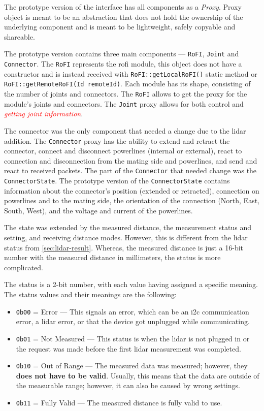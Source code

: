 \documentclass[
  digital,     %
  oneside,     %
  nosansbold,  %
  nocolorbold, %
  nolof,         %
  nolot,         %
]{fithesis4}
\newcommand{\TODO}[1]{\textcolor{red}{\textit{#1}}}
\begin{document}
{{{The prototype version of the interface has all components as a \emph{Proxy}. Proxy object is meant to be an abstraction that does not hold the ownership of the underlying component and is meant to be lightweight, safely copyable and shareable.

The prototype version contains three main components --- \lstinline[breakatwhitespace]|RoFI|, \lstinline|Joint| and \lstinline|Connector|. The \lstinline|RoFI| represents the \acrshort{rofi} module, this object does not have a constructor and is instead received with \lstinline|RoFI::getLocalRoFI()| static method or \lstinline|RoFI::getRemoteRoFI(Id remoteId)|. Each module has its shape, consisting of the number of joints and connectors. The \lstinline|RoFI| allows to get the proxy for the module's joints and connectors. The \lstinline|Joint| proxy allows for both control and \TODO{getting joint information}.

The connector was the only component that needed a change due to the \acrshort{lidar} addition. The \lstinline|Connector| proxy has the ability to extend and retract the connector, connect and disconnect powerlines (internal or external), react to connection and disconnection from the mating side and powerlines, and send and react to received packets. The part of the \lstinline|Connector| that needed change was the \lstinline|ConnectorState|. The prototype version of the \lstinline|ConnectorState| contains information about the connector's position (extended or retracted), connection on powerlines and to the mating side, the orientation of the connection (North, East, South, West), and the voltage and current of the powerlines.

The state was extended by the measured distance, the measurement status and setting, and receiving distance modes. However, this is different from the \acrshort{lidar} status from \autoref{sec:lidar-result}. Whereas, the measured distance is just a 16-bit number with the measured distance in millimeters, the status is more complicated.

The status is a 2-bit number, with each value having assigned a specific meaning. The status values and their meanings are the following:
\begin{itemize}
    \item \lstinline|0b00| = Error --- This signals an error, which can be an \acrshort{i2c} communication error, a \acrshort{lidar} error, or that the device got unplugged while communicating.  
    \item \lstinline|0b01| = Not Measured --- This status is when the \acrshort{lidar} is not plugged in or the request was made before the first \acrshort{lidar} measurement was completed.
    \item \lstinline|0b10| = Out of Range --- The measured data was measured; however, they \textbf{does not have to be valid}. Usually, this means that the data are outside of the measurable range; however, it can also be caused by wrong settings.
    \item \lstinline|0b11| = Fully Valid --- The measured distance is fully valid to use.
\end{itemize}

}}}
\end{document}
